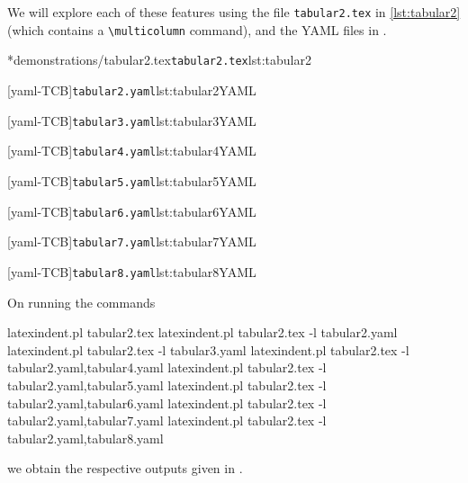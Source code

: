 	We will explore each of these features using the file \texttt{tabular2.tex} in \cref{lst:tabular2} (which contains a \lstinline!\multicolumn! command), and the YAML files in .

	\cmhlistingsfromfile[showspaces=false,showtabs=false]*{demonstrations/tabular2.tex}{\texttt{tabular2.tex}}{lst:tabular2}
	\begin{minipage}{.45\textwidth}
		[yaml-TCB]{\texttt{tabular2.yaml}}{lst:tabular2YAML}
	\end{minipage}%
	\hfill
	\begin{minipage}{.48\textwidth}
		[yaml-TCB]{\texttt{tabular3.yaml}}{lst:tabular3YAML}
	\end{minipage}%

	\begin{minipage}{.45\textwidth}
		[yaml-TCB]{\texttt{tabular4.yaml}}{lst:tabular4YAML}
	\end{minipage}%
	\hfill
	\begin{minipage}{.48\textwidth}
		[yaml-TCB]{\texttt{tabular5.yaml}}{lst:tabular5YAML}
	\end{minipage}%

	\begin{minipage}{.45\textwidth}
		[yaml-TCB]{\texttt{tabular6.yaml}}{lst:tabular6YAML}
	\end{minipage}%
	\hfill
	\begin{minipage}{.48\textwidth}
		[yaml-TCB]{\texttt{tabular7.yaml}}{lst:tabular7YAML}
	\end{minipage}%

	\begin{minipage}{.48\textwidth}
		[yaml-TCB]{\texttt{tabular8.yaml}}{lst:tabular8YAML}
	\end{minipage}%

	On running the commands \begin{commandshell}
latexindent.pl tabular2.tex 
latexindent.pl tabular2.tex -l tabular2.yaml
latexindent.pl tabular2.tex -l tabular3.yaml
latexindent.pl tabular2.tex -l tabular2.yaml,tabular4.yaml
latexindent.pl tabular2.tex -l tabular2.yaml,tabular5.yaml
latexindent.pl tabular2.tex -l tabular2.yaml,tabular6.yaml
latexindent.pl tabular2.tex -l tabular2.yaml,tabular7.yaml
latexindent.pl tabular2.tex -l tabular2.yaml,tabular8.yaml
        \end{commandshell} we obtain the respective outputs given in .

